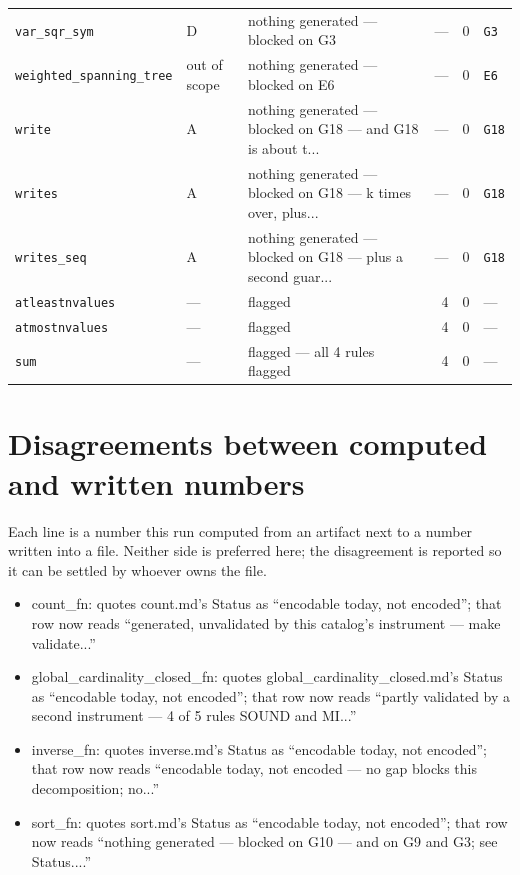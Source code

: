 \documentclass[10pt,a4paper]{article}
\begin{document}
\begin{longtable}{@{}>{\raggedright\arraybackslash}p{}l>{\raggedright\arraybackslash}p{}rrl@{}}
\texttt{var\_\allowbreak{}sqr\_\allowbreak{}sym} & D & nothing generated --- blocked on G3 & --- & 0 & \texttt{G3} \\
\texttt{weighted\_\allowbreak{}spanning\_\allowbreak{}tree} & out of scope & nothing generated --- blocked on E6 & --- & 0 & \texttt{E6} \\
\texttt{write} & A & nothing generated --- blocked on G18 --- and G18 is about t... & --- & 0 & \texttt{G18} \\
\texttt{writes} & A & nothing generated --- blocked on G18 --- k times over, plus... & --- & 0 & \texttt{G18} \\
\texttt{writes\_\allowbreak{}seq} & A & nothing generated --- blocked on G18 --- plus a second guar... & --- & 0 & \texttt{G18} \\
\texttt{atleastnvalues} & --- & flagged & 4 & 0 & --- \\
\texttt{atmostnvalues} & --- & flagged & 4 & 0 & --- \\
\texttt{sum} & --- & flagged --- all 4 rules flagged & 4 & 0 & --- \\
\hline
\end{longtable}
\section{Disagreements between computed and written numbers}
Each line is a number this run computed from an artifact next to a number written into a file. Neither side is preferred here; the disagreement is reported so it can be settled by whoever owns the file.
\begin{itemize}\setlength{\itemsep}{0pt}
\item count\_fn: quotes count.md's Status as ``encodable today, not encoded''; that row now reads ``generated, unvalidated by this catalog's instrument --- make validate...''
\item global\_cardinality\_closed\_fn: quotes global\_cardinality\_closed.md's Status as ``encodable today, not encoded''; that row now reads ``partly validated by a second instrument --- 4 of 5 rules SOUND and MI...''
\item inverse\_fn: quotes inverse.md's Status as ``encodable today, not encoded''; that row now reads ``encodable today, not encoded --- no gap blocks this decomposition; no...''
\item sort\_fn: quotes sort.md's Status as ``encodable today, not encoded''; that row now reads ``nothing generated --- blocked on G10 --- and on G9 and G3; see Status....''
\end{itemize}
\end{document}
